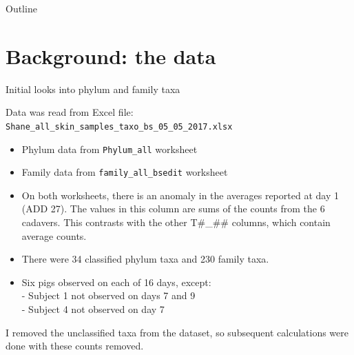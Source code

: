 \documentclass{beamer}
\begin{document}

\begin{frame}{Outline}
  \tableofcontents
\end{frame}








\section[Background]{Background: the data}


\begin{frame}{Initial looks into phylum and family taxa}

  \noindent Data was read from Excel file:\\
  \texttt{Shane\_all\_skin\_samples\_taxo\_bs\_05\_05\_2017.xlsx}

  \begin{itemize}
    \item Phylum data from \texttt{Phylum\_all} worksheet
    \item Family data from \texttt{family\_all\_bsedit} worksheet
    \item On both worksheets, there is an anomaly in the averages
      reported at day 1 (ADD 27).  The values in this column are sums
      of the counts from the 6 cadavers.  This contrasts with the
      other T\#\_\#\# columns, which contain average counts.
    \item There were 34 classified phylum taxa and 230 family taxa.
    \item Six pigs observed on each of 16 days, except:\\
      - Subject 1 not observed on days 7 and 9\\
      - Subject 4 not observed on day 7
  \end{itemize}

\noindent I removed the unclassified taxa from the dataset, so
subsequent calculations were done with these counts removed.
  
\end{frame}
\end{document}
